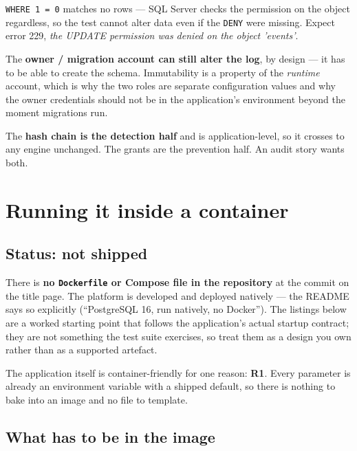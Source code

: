 \documentclass[11pt]{article}
\newcommand{\rulename}[1]{\textbf{#1}}
\begin{document}
\texttt{WHERE 1 = 0} matches no rows --- SQL Server checks the permission on the object
regardless, so the test cannot alter data even if the \texttt{DENY} were missing. Expect
error 229, \emph{the UPDATE permission was denied on the object 'events'}.

\begin{note}
The \textbf{owner / migration account can still alter the log}, by design --- it has to be
able to create the schema. Immutability is a property of the \emph{runtime} account, which
is why the two roles are separate configuration values and why the owner credentials should
not be in the application's environment beyond the moment migrations run.

The \textbf{hash chain is the detection half} and is application-level, so it crosses to any
engine unchanged. The grants are the prevention half. An audit story wants both.
\end{note}

\clearpage
\section{Running it inside a container}
\label{sec:container}

\subsection{Status: not shipped}

There is \textbf{no \texttt{Dockerfile} or Compose file in the repository} at the commit on
the title page. The platform is developed and deployed natively --- the README says so
explicitly (``PostgreSQL 16, run natively, no Docker''). The listings below are a worked
starting point that follows the application's actual startup contract; they are not
something the test suite exercises, so treat them as a design you own rather than as a
supported artefact.

The application itself is container-friendly for one reason: \rulename{R1}. Every parameter is
already an environment variable with a shipped default, so there is nothing to bake into an
image and no file to template.

\subsection{What has to be in the image}
\end{document}
